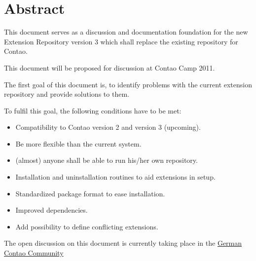\chapter{Abstract}

This document serves as a discussion and documentation foundation for the new Extension Repository version 3 which shall replace the existing repository for Contao.

This document will be proposed for discussion at Contao Camp 2011.

The first goal of this document is, to identify problems with the current extension repository and provide solutions to them.

To fulfil this goal, the following conditions have to be met:
\begin{itemize}
\item Compatibility to Contao version 2 and version 3 (upcoming).
\item Be more flexible than the current system.
\item (almost) anyone shall be able to run his/her own repository.
\item Installation and uninstallation routines to aid extensions in setup.
\item Standardized package format to ease installation.
\item Improved dependencies.
\item Add possibility to define conflicting extensions.
\end{itemize}

The open discussion on this document is currently taking place in the 
\href{http://www.contao-community.de/showthread.php?22031-Gruppe-neuer-ER-Client-und-ER3}{German Contao Community}

